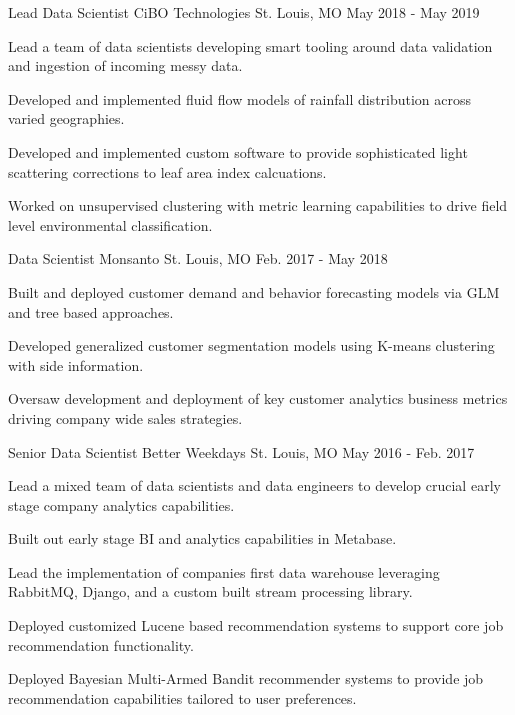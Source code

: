 \begin{cventries}
  \cventry
    {Lead Data Scientist} %
    {CiBO Technologies} %
    {St. Louis, MO} %
    {May 2018 - May 2019} %
    {
      \begin{cvitems} %
        \item {Lead a team of data scientists developing smart tooling around data validation and ingestion of incoming messy data.}
        \item {Developed and implemented fluid flow models of rainfall distribution across varied geographies.}
        \item {Developed and implemented custom software to provide sophisticated light scattering corrections to leaf area index calcuations.}
        \item {Worked on unsupervised clustering with metric learning capabilities to drive field level environmental classification.}
      \end{cvitems}
    }

  \cventry
    {Data Scientist} %
    {Monsanto} %
    {St. Louis, MO} %
    {Feb. 2017 - May 2018} %
    {
      \begin{cvitems} %
        \item {Built and deployed customer demand and behavior forecasting models via GLM and tree based approaches.}
        \item {Developed generalized customer segmentation models using K-means clustering with side information.}
        \item {Oversaw development and deployment of key customer analytics business metrics driving company wide sales strategies.}
      \end{cvitems}
    }

  \cventry
    {Senior Data Scientist} %
    {Better Weekdays} %
    {St. Louis, MO} %
    {May 2016 - Feb. 2017} %
    {
      \begin{cvitems} %
        \item {Lead a mixed team of data scientists and data engineers to develop crucial early stage company analytics capabilities.}
        \item {Built out early stage BI and analytics capabilities in Metabase.}
        \item {Lead the implementation of companies first data warehouse leveraging RabbitMQ, Django, and a custom built stream processing library.}
        \item {Deployed customized Lucene based recommendation systems to support core job recommendation functionality.}
        \item {Deployed Bayesian Multi-Armed Bandit recommender systems to provide job recommendation capabilities tailored to user preferences.}
      \end{cvitems}
    }


\end{cventries}
